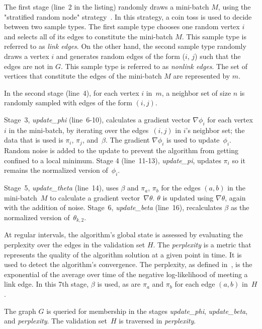 \begin{figure}[tb]

\end{figure}

The first stage (line~2 in the listing) randomly draws a mini-batch $M$,
using the "stratified random node" strategy~\cite{LiAW15}.
In this strategy, a coin toss is used to decide between two sample types.
%
The first sample type
chooses one random vertex $i$ and selects all of its edges to constitute the
mini-batch $M$. This sample type is referred to as \textit{link edges}. On the other
hand, the second sample type randomly draws a vertex $i$ and generates
random edges of the form ($i$, $j$) such that the edges are not in $G$. This
sample type is referred to as \textit{nonlink edges}. The set of vertices that
constitute the edges of the mini-batch $M$ are represented by $m$.

In the second stage (line~4), for each vertex $i$ in~$m$, a neighbor set of
size $n$ is randomly sampled with edges of the form $(i,j)$.

Stage~3, \textit{update\_phi} (line~6-10), calculates a gradient vector
$\nabla\phi_i$ for each vertex $i$ in the mini-batch, by iterating over
the edges~${(i,j)}$ in $i$'s neighbor set; the data that is used is
$\pi_i$, $\pi_j$,
and~$\beta$. The gradient $\nabla\phi_i$ is used to update~$\phi_i$. Random
noise is added to the update to prevent the algorithm from getting confined
to a local minimum.
Stage 4 (line~11-13), \textit{update\_pi}, updates $\pi_i$ so it remains
the normalized version of~$\phi_i$.

Stage~5, \textit{update\_theta} (line~14),
uses $\beta$ and $\pi_a$, $\pi_b$ for the edges $(a,b)$ in the mini-batch~$M$ to
calculate a
gradient vector~$\nabla\theta$. $\theta$ is updated using $\nabla\theta$, again
with the addition of noise. Stage~6, \textit{update\_beta} (line~16),
recalculates $\beta$ as the normalized
version of~$\theta_{k,2}$.

At regular intervals, the algorithm's global state is assessed by
evaluating the perplexity over the edges in the validation set $H$. The
\textit{perplexity} is a metric that represents the quality of the algorithm solution at
a given point in time. It is used to detect the algorithm's
convergence.
The
perplexity, as defined in~\cite{LiAW15}, is the exponential
of the average over time of the negative
log-likelihood of meeting a link edge. In this 7th stage, $\beta$ is used,
as are $\pi_a$ and $\pi_b$ for each edge $(a,b)$ in~$H$.

The graph $G$ is queried for membership in the stages \textit{update\_phi},
\textit{update\_beta}, and \textit{perplexity}. The validation set~$H$ is
traversed in \textit{perplexity}.

